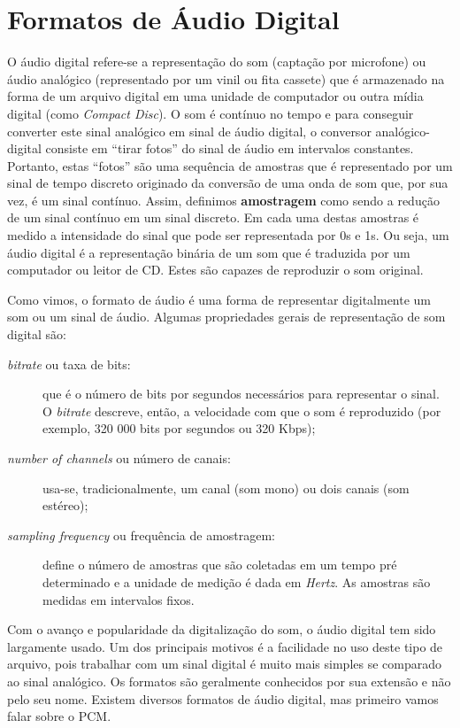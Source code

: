 \section{Formatos de Áudio Digital}

O áudio digital refere-se a representação do som (captação por microfone) ou áudio analógico (representado por um vinil ou fita cassete) que é armazenado na forma de um arquivo digital em uma unidade de computador ou outra mídia digital (como \textit{Compact Disc}). O som é contínuo no tempo e para conseguir converter este sinal analógico em sinal de áudio digital, o conversor analógico-digital consiste em ``tirar fotos'' do sinal de áudio em intervalos constantes. Portanto, estas ``fotos'' são uma sequência de amostras que é representado por um sinal de tempo discreto originado da conversão de uma onda de som que, por sua vez, é um sinal contínuo. Assim, definimos \textbf{amostragem} como sendo a redução de um sinal contínuo em um sinal discreto. Em cada uma destas amostras é medido a intensidade do sinal que pode ser representada por 0s e 1s. Ou seja, um áudio digital é a representação binária de um som que é traduzida por um computador ou leitor de CD. Estes são capazes de reproduzir o som original.

Como vimos, o formato de áudio é uma forma de representar digitalmente um som ou um sinal de áudio. Algumas propriedades gerais de representação de som digital são:

\begin{description}
	\item [\textit{bitrate} ou taxa de bits:] que é o número de bits por segundos necessários para representar o sinal. O \textit{bitrate} descreve, então, a velocidade com que o som é reproduzido (por exemplo, 320 000 bits por segundos ou 320 Kbps);
	\item [\textit{number of channels} ou número de canais:] usa-se, tradicionalmente, um canal (som mono) ou dois canais (som estéreo); 
	\item [\textit{sampling frequency} ou frequência de amostragem:] define o número de amostras que são coletadas em um tempo pré determinado e a unidade de medição é dada em \textit{Hertz}. As amostras são medidas em intervalos fixos.
\end{description}

Com o avanço e popularidade da digitalização do som, o áudio digital tem sido largamente usado. Um dos principais motivos é a facilidade no uso deste tipo de arquivo, pois trabalhar com um sinal digital é muito mais simples se comparado ao sinal analógico. Os formatos são geralmente conhecidos por sua extensão e não pelo seu nome. Existem diversos formatos de áudio digital, mas primeiro vamos falar sobre o PCM.

